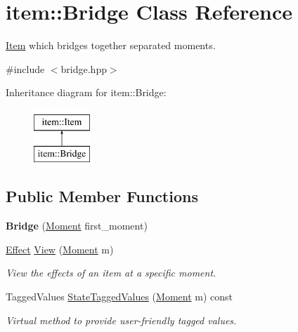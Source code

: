 \hypertarget{classitem_1_1_bridge}{}\section{item\+:\+:Bridge Class Reference}
\label{classitem_1_1_bridge}


\hyperlink{classitem_1_1_item}{Item} which bridges together separated moments.  




{\ttfamily \#include $<$bridge.\+hpp$>$}

Inheritance diagram for item\+:\+:Bridge\+:\begin{figure}[H]
\begin{center}
\leavevmode
\includegraphics[height=2.000000cm]{classitem_1_1_bridge}
\end{center}
\end{figure}
\subsection*{Public Member Functions}
\begin{DoxyCompactItemize}
\item 
\mbox{\label{classitem_1_1_bridge_a5bc97b39c3fcb52578942f5f41d7bb7d}} 
{\bfseries Bridge} (\hyperlink{classtimeplane_1_1_moment}{Moment} first\+\_\+moment)
\item 
\hyperlink{classitem_1_1_effect}{Effect} \hyperlink{classitem_1_1_bridge_a7d579da1f368ba6a6b5dfd41de833f17}{View} (\hyperlink{classtimeplane_1_1_moment}{Moment} m)
\begin{DoxyCompactList}\small\item\em View the effects of an item at a specific moment. \end{DoxyCompactList}\item 
Tagged\+Values \hyperlink{classitem_1_1_bridge_a6339e1cd46f454625ef7cd6dc683f6cd}{State\+Tagged\+Values} (\hyperlink{classtimeplane_1_1_moment}{Moment} m) const
\begin{DoxyCompactList}\small\item\em Virtual method to provide user-\/friendly tagged values. \end{DoxyCompactList}\end{DoxyCompactItemize}
